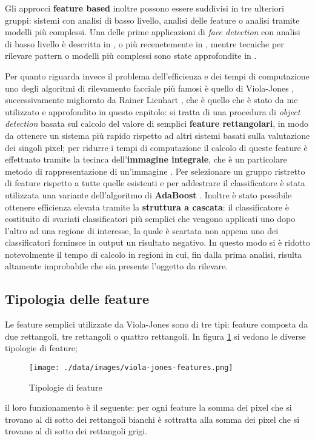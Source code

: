 Gli approcci \textbf{feature based} inoltre possono essere suddivisi in tre ulteriori gruppi: sistemi con analisi di basso livello, analisi delle feature o analisi tramite modelli più complessi. Una delle prime applicazioni di \textit{face detection} con analisi di basso livello è descritta in \cite{sakai1972computer}, o più recenetemente in \cite{govindaraju1996locating}, mentre tecniche per rilevare pattern o modelli più complessi sono state approfondite in \cite{lanitis1994automatic}.

Per quanto riguarda invece il problema dell'efficienza e dei tempi di computazione uno degli algoritmi di rilevamento facciale più famosi è quello di Viola-Jones \cite{viola2001rapid}, successivamente migliorato da Rainer Lienhart \cite{lienhart2002extended}, che è quello che è stato da me utilizzato e approfondito in questo capitolo: si tratta di una procedura di \textit{object detection} basata sul calcolo del valore di semplici \textbf{feature rettangolari}, in modo da ottenere un sistema più rapido rispetto ad altri sistemi basati sulla valutazione dei singoli pixel; per ridurre i tempi di computazione il calcolo di queste feature è effettuato tramite la tecinca dell'\textbf{immagine integrale}, che è un particolare metodo di rappresentazione di un'immagine \cite{viola2001rapid}. Per selezionare un gruppo ristretto di feature rispetto a tutte quelle esistenti e per addestrare il classificatore è stata utilizzata una variante dell'algoritmo di \textbf{AdaBoost} \cite{viola2001rapid}. Inoltre è stato possibile ottenere efficienza elevata tramite la \textbf{struttura a cascata}: il classificatore è costituito di svariati classificatori più semplici che vengono applicati uno dopo l'altro ad una regione di interesse, la quale è scartata non appena uno dei classificatori forninsce in output un risultato negativo. In questo modo si è ridotto notevolmente il tempo di calcolo in regioni in cui, fin dalla prima analisi, risulta altamente improbabile che sia presente l'oggetto da rilevare.

\subsection{Tipologia delle feature}
Le feature semplici utilizzate da Viola-Jones \cite{viola2001rapid} sono di tre tipi: feature composta da due rettangoli, tre rettangoli o quattro rettangoli. In figura \ref{features} si vedono le diverse tipologie di feature; 
\begin{figure}
	\centering
	\texttt{[image: ./data/images/viola-jones-features.png]}
	\caption{Tipologie di feature \cite{viola2001rapid}}
	\label{features}
\end{figure}
il loro funzionamento è il seguente: per ogni feature la somma dei pixel che si trovano al di sotto dei rettangoli bianchi è sottratta alla somma dei pixel che si trovano al di sotto dei rettangoli grigi.

